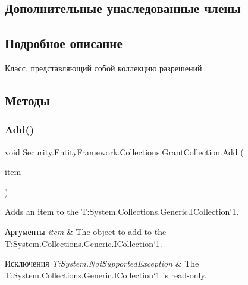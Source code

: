 \subsection*{Дополнительные унаследованные члены}


\subsection{Подробное описание}
Класс, представляющий собой коллекцию разрешений 



\subsection{Методы}
\mbox{\label{class_security_1_1_entity_framework_1_1_collections_1_1_grant_collection_a5862e7e9a12c92f3657c9cc9f2757c6d}} 
\subsubsection{\texorpdfstring{Add()}{Add()}\hspace{0.1cm}{\footnotesize\ttfamily [1/3]}}
{\footnotesize\ttfamily void Security.\+Entity\+Framework.\+Collections.\+Grant\+Collection.\+Add (\begin{DoxyParamCaption}\item[{\hyperlink{interface_security_1_1_interfaces_1_1_model_1_1_i_grant}{I\+Grant}}]{item }\end{DoxyParamCaption})}



Adds an item to the T\+:\+System.\+Collections.\+Generic.\+I\+Collection`1. 


\begin{DoxyParams}{Аргументы}
{\em item} & The object to add to the T\+:\+System.\+Collections.\+Generic.\+I\+Collection`1.\\
\hline
\end{DoxyParams}

\begin{DoxyExceptions}{Исключения}
{\em T\+:\+System.\+Not\+Supported\+Exception} & The T\+:\+System.\+Collections.\+Generic.\+I\+Collection`1 is read-\/only.\\
\hline
\end{DoxyExceptions}
\mbox{\label{class_security_1_1_entity_framework_1_1_collections_1_1_grant_collection_a7ebc4e3c1d4acadbf2ce58565888e7e4}} 
